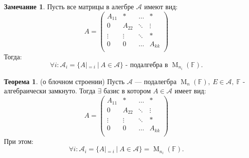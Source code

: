 \documentclass[a4paper, 14pt]{extarticle}
\theoremstyle{definition}
\newtheorem{theorem}{Теорема}
\newtheorem{note}{Замечание}
\begin{document}
\begin{note} \label{nt3_1}
	Пусть все матрицы в алегбре \(\mathcal{A}\) имеют вид:
	\[A = \left(
		\begin{array}{c|c|c|c}
			A_{11} & * & \hdots & * \\
			\hline
			0 & A_{22} & \ddots & \vdots \\
			\hline
			\vdots & \vdots & \ddots & * \\
			\hline
			0 & 0 & \hdots & A_{kk} \\
		\end{array}
	\right)\]
	Тогда:
	\[\forall i : \mathcal{A}_i = \{A|_{= i}\ |\ A \in \mathcal{A} \} \text{ - подалгебра в } \operatorname{M}_{n_i}(\mathbb{F}).\]
\end{note}

\begin{theorem} \label{th3_1}
	(о блочном строении) Пусть \(\mathcal{A}\) --- подалегбра \(\operatorname{M}_n(\mathbb{F}),\ E \in \mathcal{A},\ \mathbb{F}\) - алгебраически замкнуто. Тогда \(\exists\) базис в котором \(A \in \mathcal{A}\) имеет вид:
	\[A = \left(
	\begin{array}{c|c|c|c}
		A_{11} & * & \hdots & * \\
		\hline
		0 & A_{22} & \ddots & \vdots \\
		\hline
		\vdots & \vdots & \ddots & * \\
		\hline
		0 & 0 & \hdots & A_{kk} \\
	\end{array}
	\right)\]
	При этом:
	\[\forall i : \mathcal{A}_i = \{A|_{=i}\ |\ A \in \mathcal{A}\} = \operatorname{M}_{n_i}(\mathbb{F}).\]
\end{theorem}
\end{document}
